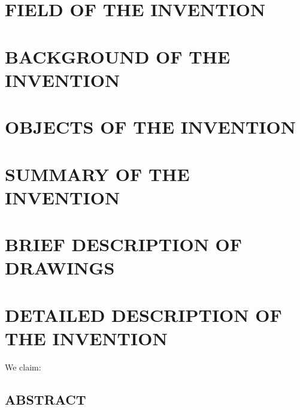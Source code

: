 \documentclass[10pt, a4paper]{article}
\begin{document}
	
	
	\clearpage
	\newpage
	
	\linenumbers
	\doublespacing

	\section*{{\MakeUppercase{\normalsize Field of the Invention}}}
	

	\section*{{\MakeUppercase{\normalsize Background of the Invention}}}
	

	\section*{{\MakeUppercase{\normalsize Objects of the Invention}}}
	

	\section*{{\MakeUppercase{\normalsize Summary of the Invention}}}
	

	\section*{{\MakeUppercase{\normalsize Brief Description of Drawings}}} 
	

	\section*{{\MakeUppercase{\normalsize Detailed Description of the Invention}}}
	
	
	\clearpage
	\newpage

	\noindent
	We claim:
	

	\clearpage
	\newpage

	\begin{center}
		\section*{{\MakeUppercase{\normalsize Abstract}}}
	\end{center}

	
	
\end{document}
